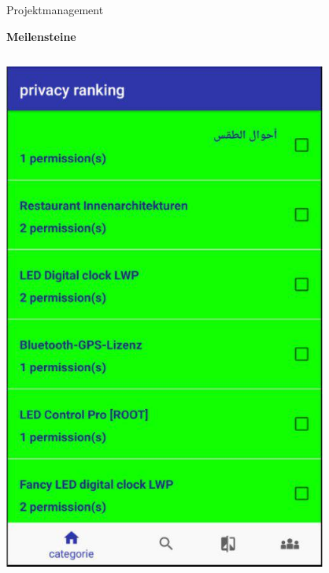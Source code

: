 \documentclass[compress,t]{beamer}
\begin{document}
\begin{frame}{Projektmanagement}

    \textbf{Meilensteine}

    \begin{columns}[t]
        \centering
        \includegraphics[width=0.8\textwidth]{img/3.jpg}\\
        \centering

\end{columns}
\end{frame}
\end{document}
